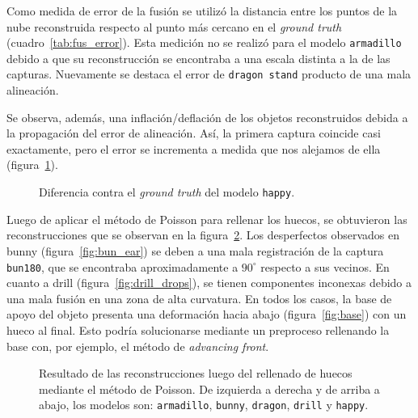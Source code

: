 		Como medida de error de la fusión se utilizó la distancia entre los puntos de la nube reconstruida
		respecto al punto más cercano en el \emph{ground truth} (cuadro~\ref{tab:fus_error}).
		Esta medición no se realizó para el modelo \texttt{armadillo} debido a que su reconstrucción
		se encontraba a una escala distinta a la de las capturas.
		Nuevamente se destaca el error de \texttt{dragon stand} producto de una mala alineación.

		


		Se observa, además, una inflación/deflación de los objetos
		reconstruidos debida a la propagación del error de alineación.  Así, la
		primera captura coincide casi exactamente, pero el error se incrementa
		a medida que nos alejamos de ella (figura~\ref{fig:fus_happy}).

		\begin{figure}
			\caption{\label{fig:fus_happy}Diferencia contra el \emph{ground truth} del modelo \texttt{happy}.}
		\end{figure}


		Luego de aplicar el método de Poisson para rellenar los huecos, se
		obtuvieron las reconstrucciones que se observan en la
		figura~\ref{fig:poiss_all}.
		Los desperfectos observados en bunny (figura~\ref{fig:bun_ear}) se deben a una mala registración
		de la captura \texttt{bun180}, que se encontraba aproximadamente a
		$90^{\circ}$ respecto a sus vecinos.
		En cuanto a drill (figura~\ref{fig:drill_drops}), se tienen componentes
		inconexas debido a una mala fusión en una zona de alta curvatura.
		En todos los casos, la base de apoyo del objeto presenta una
		deformación hacia abajo (figura~\ref{fig:base}) con un hueco al final.
		Esto podría solucionarse mediante un preproceso rellenando la base con,
		por ejemplo, el método de \emph{advancing front}.

		\begin{figure}
			\caption{\label{fig:poiss_all}Resultado de las reconstrucciones luego del rellenado de huecos mediante el método de Poisson.
			De izquierda a derecha y de arriba a abajo, los modelos son:
			\texttt{armadillo},
			\texttt{bunny},
			\texttt{dragon},
			\texttt{drill}
			y \texttt{happy}.}
		\end{figure}

